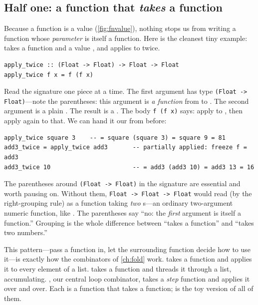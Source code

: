 \subsection{Half one: a function that \emph{takes} a function}

Because a function is a value (\cref{fig:fnvalue}), nothing stops us from writing
a function whose \emph{parameter} is itself a function. Here is the cleanest tiny
example:  takes a function  and a value , and
applies  to  twice.

\begin{lstlisting}[style=l4style]
apply_twice :: (Float -> Float) -> Float -> Float
apply_twice f x = f (f x)
\end{lstlisting}

\noindent Read the signature one piece at a time. The first argument has type
\lstinline[style=l4style]|(Float -> Float)|---note the parentheses: this argument
is \emph{a function} from  to . The second argument is a
plain . The result is a . The body
\lstinline[style=l4style]|f (f x)| says: apply  to , then apply
 again to that. We can hand it our  from before:

\begin{lstlisting}[style=l4style]
apply_twice square 3    -- = square (square 3) = square 9 = 81
add3_twice = apply_twice add3       -- partially applied: freeze f = add3
add3_twice 10                       -- = add3 (add3 10) = add3 13 = 16
\end{lstlisting}

\noindent The parentheses around \lstinline[style=l4style]|(Float -> Float)| in
the signature are essential and worth pausing on. Without them,
\lstinline[style=l4style]|Float -> Float -> Float| would read (by the
right-grouping rule) as a function taking \emph{two} s---an ordinary
two-argument numeric function, like . The parentheses say ``no: the
\emph{first} argument is itself a function.'' Grouping is the whole difference
between ``takes a function'' and ``takes two numbers.''

This pattern---pass a function in, let the surrounding function decide how to use
it---is exactly how the combinators of \cref{ch:fold} work.  takes a
function and applies it to every element of a list.  takes a function
and threads it through a list, accumulating. , our central
loop combinator, takes a \emph{step} function and applies it over and over. Each
is a function that takes a function;  is the toy version of all
of them.

